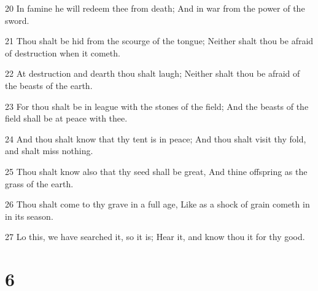 \par 20 In famine he will redeem thee from death; And in war from the power of the sword.
\par 21 Thou shalt be hid from the scourge of the tongue; Neither shalt thou be afraid of destruction when it cometh.
\par 22 At destruction and dearth thou shalt laugh; Neither shalt thou be afraid of the beasts of the earth.
\par 23 For thou shalt be in league with the stones of the field; And the beasts of the field shall be at peace with thee.
\par 24 And thou shalt know that thy tent is in peace; And thou shalt visit thy fold, and shalt miss nothing.
\par 25 Thou shalt know also that thy seed shall be great, And thine offspring as the grass of the earth.
\par 26 Thou shalt come to thy grave in a full age, Like as a shock of grain cometh in in its season.
\par 27 Lo this, we have searched it, so it is; Hear it, and know thou it for thy good.

\chapter{6}

